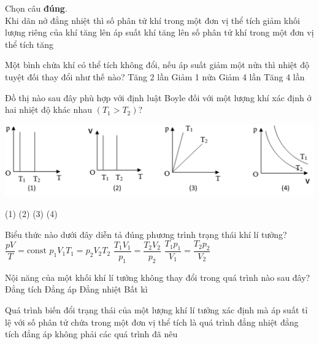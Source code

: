 \begin{ex}
	Chọn câu \textbf{đúng}.\\
	Khi dãn nở đẳng nhiệt thì	
	\choice
	{\True số phân tử khí trong một đơn vị thể tích giảm}
	{khối lượng riêng của khí tăng lên}
	{áp suất khí tăng lên}
	{số phân tử khí trong một đơn vị thể tích tăng}
	\loigiai{}
\end{ex}
\begin{ex}
	Một bình chứa khí có thể tích không đổi, nếu áp suất giảm một nửa thì nhiệt độ tuyệt đối thay đổi như thế nào?	
	\choice
	{Tăng 2 lần}
	{\True Giảm 1 nửa}
	{Giảm 4 lần}
	{Tăng 4 lần}
\end{ex}

\begin{ex}
	Đồ thị nào sau đây phù hợp với định luật Boyle đối với một lượng khí xác định ở hai nhiệt độ khác nhau $\left(T_1>T_2\right)$?	
	\begin{center}
		\includegraphics[width=0.65\linewidth]{../figs/G12-D2-2}
	\end{center}
	\choice
	{(1)}
	{(2)}
	{(3)}
	{\True (4)}
	\loigiai{}
\end{ex}
\begin{ex}
	Biểu thức nào dưới đây diễn tả đúng phương trình trạng thái khí lí tưởng?
	\choice
	{\True $\dfrac{pV}{T}=\text{const}$}
	{$p_1V_1T_1=p_2V_2T_2$}
	{$\dfrac{T_1V_1}{p_1}=\dfrac{T_2V_2}{p_2}$}
	{$\dfrac{T_1p_1}{V_1}=\dfrac{T_2p_2}{V_2}$}
	\loigiai{}
\end{ex}
\begin{ex}
	Nội năng của một khối khí lí tưởng không thay đổi trong quá trình nào sau đây?
	\choice
	{Đẳng tích}
	{Đẳng áp}
	{\True Đẳng nhiệt}
	{Bất kì}
	\loigiai{}
\end{ex}
\begin{ex}
	Quá trình biến đổi trạng thái của một lượng khí lí tưởng xác định mà áp suất tỉ lệ với số phân tử chứa trong một đơn vị thể tích là quá trình
	\choice
	{\True đẳng nhiệt}
	{đẳng tích}
	{đẳng áp}
	{không phải các quá trình đã nêu}
\end{ex}

